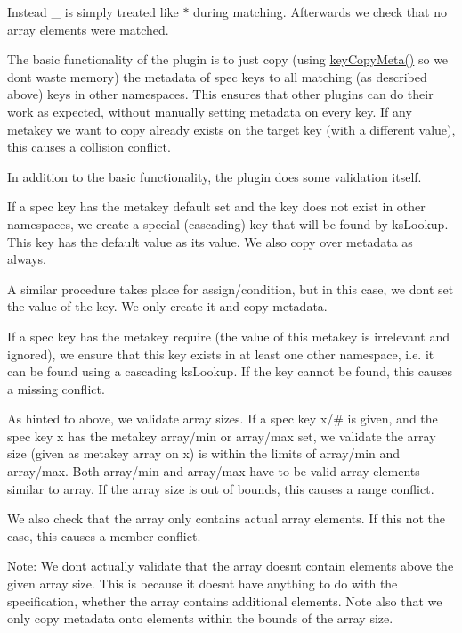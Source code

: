 Instead {\ttfamily \+\_\+} is simply treated like {\ttfamily $\ast$} during matching. Afterwards we check that no array elements were matched.

The basic functionality of the plugin is to just copy (using {\ttfamily \mbox{\hyperlink{group__keymeta_ga9a22b992478e613c8788bd460b4a1f0c}{key\+Copy\+Meta()}}} so we don\textquotesingle{}t waste memory) the metadata of spec keys to all matching (as described above) keys in other namespaces. This ensures that other plugins can do their work as expected, without manually setting metadata on every key. If any metakey we want to copy already exists on the target key (with a different value), this causes a {\ttfamily collision} conflict.

In addition to the basic functionality, the plugin does some validation itself.

If a spec key has the metakey {\ttfamily default} set and the key does not exist in other namespaces, we create a special (cascading) key that will be found by {\ttfamily ks\+Lookup}. This key has the {\ttfamily default} value as its value. We also copy over metadata as always.

A similar procedure takes place for {\ttfamily assign/condition}, but in this case, we don\textquotesingle{}t set the value of the key. We only create it and copy metadata.

If a spec key has the metakey {\ttfamily require} (the value of this metakey is irrelevant and ignored), we ensure that this key exists in at least one other namespace, i.\+e. it can be found using a cascading {\ttfamily ks\+Lookup}. If the key cannot be found, this causes a {\ttfamily missing} conflict.

As hinted to above, we validate array sizes. If a spec key {\ttfamily x/\#} is given, and the spec key {\ttfamily x} has the metakey {\ttfamily array/min} or {\ttfamily array/max} set, we validate the array size (given as metakey {\ttfamily array} on {\ttfamily x}) is within the limits of {\ttfamily array/min} and {\ttfamily array/max}. Both {\ttfamily array/min} and {\ttfamily array/max} have to be valid array-\/elements similar to {\ttfamily array}. If the array size is out of bounds, this causes a {\ttfamily range} conflict.

We also check that the array only contains actual array elements. If this not the case, this causes a {\ttfamily member} conflict.

Note\+: We don\textquotesingle{}t actually validate that the array doesn\textquotesingle{}t contain elements above the given array size. This is because it doesn\textquotesingle{}t have anything to do with the specification, whether the array contains additional elements. Note also that we only copy metadata onto elements within the bounds of the array size.

